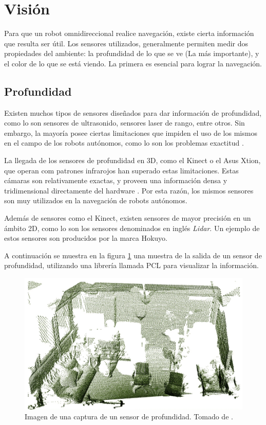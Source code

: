 \section{Visión}
Para que un robot omnidireccional realice navegación, existe cierta información que resulta ser útil. Los sensores utilizados, generalmente permiten medir dos propiedades del ambiente: la profundidad de lo que se ve (La más importante), y el color de lo que se está viendo. La primera es esencial para lograr la navegación.

\subsection{Profundidad}
Existen muchos tipos de sensores diseñados para dar información de profundidad, como lo son sensores de ultrasonido, sensores laser de rango, entre otros. Sin embargo, la mayoría posee ciertas limitaciones que impiden el uso de los mismos en el campo de los robots autónomos, como lo son los problemas exactitud \cite{DanielMaierArminHornung2012}.

La llegada de los sensores de profundidad en 3D, como el Kinect o el Asus Xtion, que operan com patrones infrarojos han superado estas limitaciones. Estas cámaras son relativamente exactas, y proveen una información densa y tridimensional directamente del hardware \cite{DanielMaierArminHornung2012}. Por esta razón, los mismos sensores son muy utilizados en la navegación de robots autónomos.

Además de sensores como el Kinect, existen sensores de mayor precisión en un ámbito 2D, como lo son los sensores denominados en inglés \textit{Lidar}. Un ejemplo de estos sensores son producidos por la marca Hokuyo.

A continuación se muestra en la figura \ref{F:pointcloud} una muestra de la salida de un sensor de profundidad, utilizando una librería llamada PCL para visualizar la información.

\begin{figure}[H]
\centering
\includegraphics[scale=0.4]{imagenes/rviz_pointcloud.png}
\caption{Imagen de una captura de un sensor de profundidad. Tomado de \cite{Rusu2011}.}
\label{F:pointcloud}
\end{figure}

